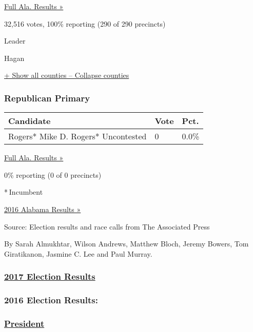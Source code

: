 \href{https://www.nytimes3xbfgragh.onion/elections/results/alabama}{Full
Ala. Results »}

32,516 votes, 100\% reporting (290 of 290 precincts)

Leader

 Hagan

\protect\hyperlink{}{+ Show all counties -- Collapse counties}

\hypertarget{republican-primary}{%
\subsubsection{Republican Primary}\label{republican-primary}}

\begin{longtable}[]{@{}lll@{}}
\toprule
Candidate & Vote & Pct.\tabularnewline
\midrule
\endhead
 Rogers* Mike D. Rogers* Uncontested & 0 & 0.0\%\tabularnewline
\bottomrule
\end{longtable}

\href{https://www.nytimes3xbfgragh.onion/elections/results/alabama}{Full
Ala. Results »}

0\% reporting (0 of 0 precincts)

* Incumbent

\href{https://www.nytimes3xbfgragh.onion/elections/results/alabama}{2016
Alabama Results »}

Source: Election results and race calls from The Associated Press

By Sarah Almukhtar, Wilson Andrews, Matthew Bloch, Jeremy Bowers, Tom
Giratikanon, Jasmine C. Lee and Paul Murray.

\hypertarget{2017-election-results}{%
\subsubsection{\texorpdfstring{\href{https://www.nytimes3xbfgragh.onion/interactive/2017/us/elections/election-calendar.html}{2017
Election Results}}{2017 Election Results}}\label{2017-election-results}}

\hypertarget{2016-election-results}{%
\subsubsection{2016 Election Results:}\label{2016-election-results}}

\hypertarget{president}{%
\subsubsection{\texorpdfstring{\href{https://www.nytimes3xbfgragh.onion/elections/results/president}{President}}{President}}\label{president}}

